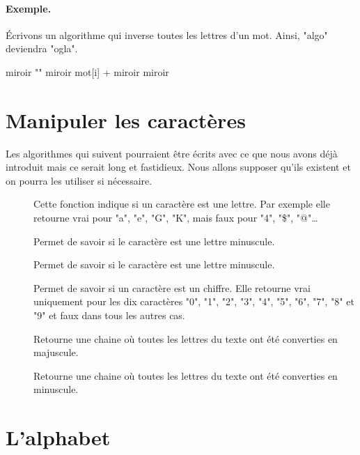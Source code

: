 	\paragraph{Exemple.}
	Écrivons un algorithme qui inverse toutes les lettres d'un mot.
	Ainsi, "algo" deviendra "ogla".
	\begin{LDA}
			\Let miroir \Gets ""
				\Let miroir \Gets mot[i] + miroir
			\EndFor
			\Return miroir
		\EndAlgo
	\end{LDA}
	
\section{Manipuler les caractères}

	Les algorithmes qui suivent pourraient être écrits
	avec ce que nous avons déjà introduit mais ce serait long
	et fastidieux. 
	Nous allons supposer qu'ils existent et on pourra les utiliser
	si nécessaire.
	
	\begin{description}
	\item[]
		Cette fonction indique si un caractère est une lettre. 
		Par exemple elle retourne vrai pour "a", "e", "G", "K", 
		mais faux pour "4", "\$", "@"\dots %
	\item[]	
		Permet de savoir si le caractère est une lettre minuscule.
	\item[]	
		Permet de savoir si le caractère est une lettre minuscule.
	\item[]	
		Permet de savoir si un caractère est un chiffre. 
		Elle retourne vrai uniquement pour les dix caractères 
		"0", "1", "2", "3", "4", "5", "6", "7", "8" et "9" 
		et faux dans tous les autres cas.
	\item[]
		Retourne une chaine où toutes les lettres du texte
		ont été converties en majuscule.
	\item[]
		Retourne une chaine où toutes les lettres du texte
		ont été converties en minuscule.
	\end{description}
	
\section{L'alphabet}

